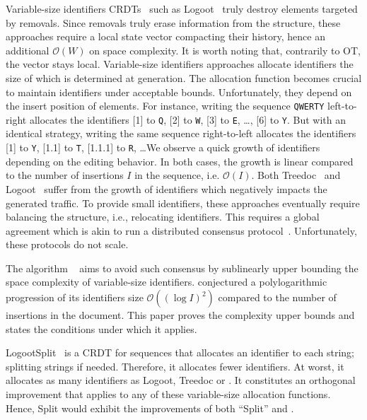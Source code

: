Variable-size identifiers CRDTs~\cite{nedelec2013lseq, preguica2009commutative,
  weiss2009logoot} such as Logoot~\cite{weiss2009logoot} truly destroy elements
targeted by removals.  Since removals truly erase information from the
structure, these approaches require a local state vector compacting their
history, hence an additional $\mathcal{O}(W)$ on space complexity. It is worth
noting that, contrarily to OT, the vector stays local. Variable-size identifiers
approaches allocate identifiers the size of which is determined at
generation. The allocation function becomes crucial to maintain identifiers
under acceptable bounds. Unfortunately, they depend on the insert position of
elements. For instance, writing the sequence \texttt{QWERTY} left-to-right
allocates the identifiers [1] to \texttt{Q}, [2] to \texttt{W}, [3] to
\texttt{E}, \ldots, [6] to \texttt{Y}. But with an identical strategy, writing
the same sequence right-to-left allocates the identifiers [1] to \texttt{Y},
[1.1] to \texttt{T}, [1.1.1] to \texttt{R}, \ldots We observe a quick growth of
identifiers depending on the editing behavior. In both cases, the growth is
linear compared to the number of insertions $I$ in the sequence,
i.e. $\mathcal{O}(I)$. Both Treedoc~\cite{preguica2009commutative} and
Logoot~\cite{weiss2009logoot, weiss2010logootundo} suffer from the growth of
identifiers which negatively impacts the generated traffic.
To provide small identifiers, these approaches eventually require balancing the
structure, i.e., relocating identifiers. This requires a global agreement which is
akin to run a distributed consensus
protocol~\cite{zawirski2011asynchronous}. Unfortunately, these protocols do not
scale.

\noindent The algorithm \LSEQ~\cite{nedelec2013lseq} aims to avoid such
consensus by sublinearly upper bounding the space complexity of variable-size
identifiers. \cite{nedelec2013lseq} conjectured a polylogarithmic progression of
its identifiers size $\mathcal{O}((\log I)^2)$ compared to the number of
insertions in the document. This paper proves the complexity upper bounds and
states the conditions under which it applies.

LogootSplit~\cite{andre2013supporting} is a CRDT for sequences that allocates an
identifier to each string; splitting strings if needed. Therefore, it allocates
fewer identifiers. At worst, it allocates as many identifiers as Logoot, Treedoc
or \LSEQ. It constitutes an orthogonal improvement that applies to any of these
variable-size allocation functions. Hence, \LSEQ{}Split would exhibit the
improvements of both ``Split'' and \LSEQ.


